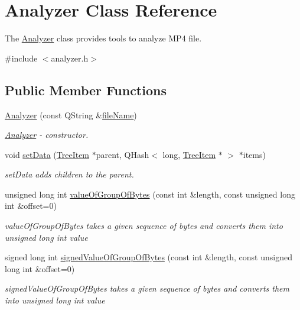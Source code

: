 \hypertarget{class_analyzer}{\section{Analyzer Class Reference}
\label{class_analyzer}
}


The \hyperlink{class_analyzer}{Analyzer} class provides tools to analyze M\-P4 file.  




{\ttfamily \#include $<$analyzer.\-h$>$}

\subsection*{Public Member Functions}
\begin{DoxyCompactItemize}
\item 
\hyperlink{class_analyzer_a0ac7f4497a561cd794b1da203e38368d}{Analyzer} (const Q\-String \&\hyperlink{class_analyzer_a73d4ffb680459092c5797f515a693cde}{file\-Name})
\begin{DoxyCompactList}\small\item\em \hyperlink{class_analyzer}{Analyzer} -\/ constructor. \end{DoxyCompactList}\item 
void \hyperlink{class_analyzer_af471f3443e7b987d3a6000206ba532ef}{set\-Data} (\hyperlink{class_tree_item}{Tree\-Item} $\ast$parent, Q\-Hash$<$ long, \hyperlink{class_tree_item}{Tree\-Item} $\ast$ $>$ $\ast$items)
\begin{DoxyCompactList}\small\item\em set\-Data adds children to the parent. \end{DoxyCompactList}\item 
unsigned long int \hyperlink{class_analyzer_a706f8e8e10f99f2dadb069231f360078}{value\-Of\-Group\-Of\-Bytes} (const int \&length, const unsigned long int \&offset=0)
\begin{DoxyCompactList}\small\item\em value\-Of\-Group\-Of\-Bytes takes a given sequence of bytes and converts them into unsigned long int value \end{DoxyCompactList}\item 
signed long int \hyperlink{class_analyzer_a6ac4d158f43c29d9eb0a3ef8ee749001}{signed\-Value\-Of\-Group\-Of\-Bytes} (const int \&length, const unsigned long int \&offset=0)
\begin{DoxyCompactList}\small\item\em signed\-Value\-Of\-Group\-Of\-Bytes takes a given sequence of bytes and converts them into unsigned long int value \end{DoxyCompactList}\item 

\end{DoxyCompactItemize}
